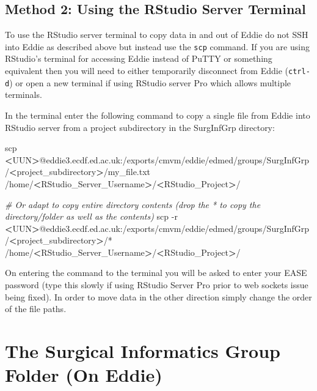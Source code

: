 \documentclass[]{book}
\newenvironment{Shaded}{\begin{snugshade}}{\end{snugshade}}
\newcommand{\CommentTok}[1]{\textcolor[rgb]{0.56,0.35,0.01}{\textit{#1}}}
\newcommand{\FunctionTok}[1]{\textcolor[rgb]{0.00,0.00,0.00}{#1}}
\newcommand{\NormalTok}[1]{#1}
\newcommand{\OperatorTok}[1]{\textcolor[rgb]{0.81,0.36,0.00}{\textbf{#1}}}
\begin{document}
\hypertarget{method-2-using-the-rstudio-server-terminal}{%
\subsection{Method 2: Using the RStudio Server Terminal}\label{method-2-using-the-rstudio-server-terminal}}

To use the RStudio server terminal to copy data in and out of Eddie do not SSH into Eddie as described above but instead use the \texttt{scp} command. If you are using RStudio's terminal for accessing Eddie instead of PuTTY or something equivalent then you will need to either temporarily disconnect from Eddie (\texttt{ctrl-d}) or open a new terminal if using RStudio server Pro which allows multiple terminals.

In the terminal enter the following command to copy a single file from Eddie into RStudio server from a project subdirectory in the SurgInfGrp directory:

\begin{Shaded}
\begin{Highlighting}[]
\FunctionTok{scp} \OperatorTok{<}\NormalTok{UUN}\OperatorTok{>}\NormalTok{@eddie3.ecdf.ed.ac.uk:/exports/cmvm/eddie/edmed/groups/SurgInfGrp/}\OperatorTok{<}\NormalTok{project_subdirectory}\OperatorTok{>}\NormalTok{/my_file.txt /home/}\OperatorTok{<}\NormalTok{RStudio_Server_Username}\OperatorTok{>}\NormalTok{/}\OperatorTok{<}\NormalTok{RStudio_Project}\OperatorTok{>}\NormalTok{/}

\CommentTok{# Or adapt to copy entire directory contents (drop the * to copy the directory/folder as well as the contents)}
\FunctionTok{scp}\NormalTok{ -r }\OperatorTok{<}\NormalTok{UUN}\OperatorTok{>}\NormalTok{@eddie3.ecdf.ed.ac.uk:/exports/cmvm/eddie/edmed/groups/SurgInfGrp/}\OperatorTok{<}\NormalTok{project_subdirectory}\OperatorTok{>}\NormalTok{/* /home/}\OperatorTok{<}\NormalTok{RStudio_Server_Username}\OperatorTok{>}\NormalTok{/}\OperatorTok{<}\NormalTok{RStudio_Project}\OperatorTok{>}\NormalTok{/}
\end{Highlighting}
\end{Shaded}

On entering the command to the terminal you will be asked to enter your EASE password (type this slowly if using RStudio Server Pro prior to web sockets issue being fixed). In order to move data in the other direction simply change the order of the file paths.

\hypertarget{the-surgical-informatics-group-folder-on-eddie}{%
\section{The Surgical Informatics Group Folder (On Eddie)}\label{the-surgical-informatics-group-folder-on-eddie}}
\end{document}
